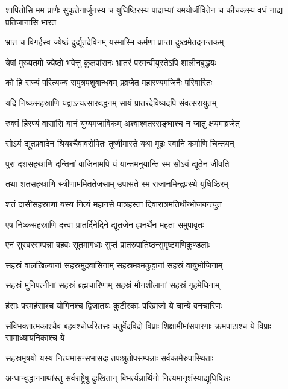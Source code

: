 \threelineshloka
{शापितोसि मम प्राणैः सुकृतेनार्जुनस्य च}
{युधिष्ठिरस्य पादाभ्यां यमयोर्जीवितेन च}
{कीचकस्य वधं नाद्य प्रतिजानासि भारत}


\twolineshloka
{भ्रात च विगर्हस्व ज्येष्ठं दुर्द्यूतदेविनम्}
{यस्मास्मि कर्मणा प्राप्ता दुःखमेतदनन्तकम्}


\twolineshloka
{येषां मुख्यतमो ज्येष्ठो भवेत्तु कुलपांसनः}
{भ्रातरं परमन्वीयुस्तेऽपि शालीनबुद्धयः}


\twolineshloka
{को हि राज्यं परित्यज्य सपुत्रपशुबान्धवम्}
{प्रव्रजेत महारण्यमजिनैः परिवारितः}


\twolineshloka
{यदि निष्कसहस्राणि यद्वाऽन्यत्सारवद्धनम्}
{सायं प्रातरदेविष्यदपि संवत्सरायुतम्}


\twolineshloka
{रुक्मं हिरण्यं वासांसि यानं युग्यमजाविकम्}
{अश्वाश्वतरसङ्घाश्च न जातु क्षयमाव्रजेत्}


\twolineshloka
{सोऽयं द्यूतप्रवादेन श्रियश्चैवावरोपितः}
{तूष्णीमास्ते यथा मूढः स्वानि कर्माणि चिन्तयन्}


\twolineshloka
{पुरा दशसहस्राणि दन्तिनां वाजिनामपि}
{यं यान्तमनुयान्ति स्म सोऽयं द्यूतेन जीवति}


\twolineshloka
{तथा शतसहस्राणि स्त्रीणाममिततेजसाम्}
{उपासते स्म राजानमिन्द्रप्रस्थे युधिष्ठिरम्}


\twolineshloka
{शतं दासीसहस्राणां यस्य नित्यं महानसे}
{पात्रहस्ता दिवारात्रमतिथीन्भोजयन्त्युत}


\twolineshloka
{एष निष्कसहस्राणि दत्त्वा प्रातर्दिनेदिने}
{द्यूतजेन ह्यनर्थेन महता समुपावृतः}


\twolineshloka
{एनं सुस्वरसम्पन्ना बहवः सूतमागधाः}
{सुप्तं प्रातरुपातिष्ठन्सुमृष्टमणिकुण्डलाः}


\twolineshloka
{सहस्रं वालखिल्यानां सहस्रमुदवासिनाम्}
{सहस्रमश्मकुट्टानां सहस्रं वायुभोजिनाम्}


\twolineshloka
{सहस्रं मुनिपत्नीनां सहस्रं ब्रह्मचारिणाम्}
{सहस्रं मौनशीलानां सहस्रं गृहमेधिनाम्}


\twolineshloka
{हंसाः परमहंसाश्च योगिनश्च द्विजातयः}
{कुटीरकाः परिव्राजो ये चान्ये वनचारिणः}


\threelineshloka
{संविभक्तात्मकाश्चैव बहवश्चोर्ध्वरेतसः}
{चतुर्वेदविदो विप्राः शिक्षामीमांसपारगाः}
{क्रमपाठाश्च ये विप्राः सामाध्यायनिकाश्च ये}


\twolineshloka
{सहस्रमृषयो यस्य नित्यमासन्सभासदः}
{तपःश्रुतोपसम्पन्नाः सर्वकामैरुपास्थिताः}


\twolineshloka
{अन्धान्वृद्धाननाथांस्तु सर्वराष्ट्रेषु दुःखितान्}
{बिभर्त्यन्नार्थिनो नित्यमानृशंस्याद्युधिष्ठिरः}


